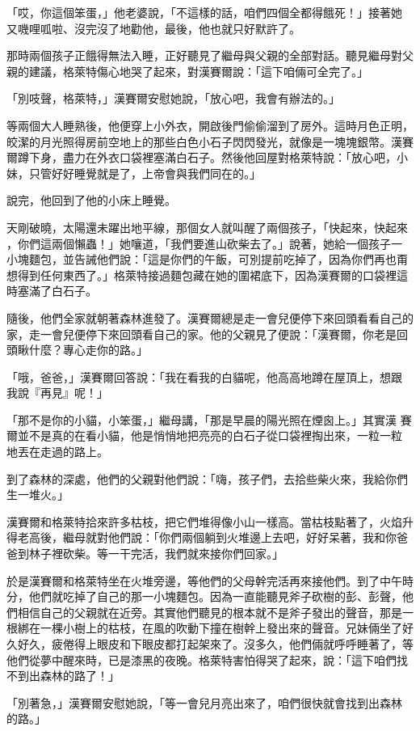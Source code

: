 \documentclass[oneside,10pt]{memoir} %
\begin{document}
「哎，你這個笨蛋，」他老婆說，「不這樣的話，咱們四個全都得餓死！」接著她
又嘰哩呱啦、沒完沒了地勸他，最後，他也就只好默許了。

那時兩個孩子正餓得無法入睡，正好聽見了繼母與父親的全部對話。聽見繼母對父
親的建議，格萊特傷心地哭了起來，對漢賽爾說：「這下咱倆可全完了。」

「別吱聲，格萊特，」漢賽爾安慰她說，「放心吧，我會有辦法的。」

等兩個大人睡熟後，他便穿上小外衣，開啟後門偷偷溜到了房外。這時月色正明，
皎潔的月光照得房前空地上的那些白色小石子閃閃發光，就像是一塊塊銀幣。漢賽
爾蹲下身，盡力在外衣口袋裡塞滿白石子。然後他回屋對格萊特說：「放心吧，小
妹，只管好好睡覺就是了，上帝會與我們同在的。」

說完，他回到了他的小床上睡覺。

天剛破曉，太陽還未躍出地平線，那個女人就叫醒了兩個孩子，「快起來，快起來
，你們這兩個懶蟲！」她嚷道，「我們要進山砍柴去了。」說著，她給一個孩子一
小塊麵包，並告誡他們說：「這是你們的午飯，可別提前吃掉了，因為你們再也甭
想得到任何東西了。」格萊特接過麵包藏在她的圍裙底下，因為漢賽爾的口袋裡這
時塞滿了白石子。

隨後，他們全家就朝著森林進發了。漢賽爾總是走一會兒便停下來回頭看看自己的
家，走一會兒便停下來回頭看自己的家。他的父親見了便說：「漢賽爾，你老是回
頭瞅什麼？專心走你的路。」

「哦，爸爸，」漢賽爾回答說：「我在看我的白貓呢，他高高地蹲在屋頂上，想跟
我說『再見』呢！」

「那不是你的小貓，小笨蛋，」繼母講，「那是早晨的陽光照在煙囪上。」其實漢
賽爾並不是真的在看小貓，他是悄悄地把亮亮的白石子從口袋裡掏出來，一粒一粒
地丟在走過的路上。

到了森林的深處，他們的父親對他們說：「嗨，孩子們，去拾些柴火來，我給你們
生一堆火。」

漢賽爾和格萊特拾來許多枯枝，把它們堆得像小山一樣高。當枯枝點著了，火焰升
得老高後，繼母就對他們說：「你們兩個躺到火堆邊上去吧，好好呆著，我和你爸
爸到林子裡砍柴。等一干完活，我們就來接你們回家。」

於是漢賽爾和格萊特坐在火堆旁邊，等他們的父母幹完活再來接他們。到了中午時
分，他們就吃掉了自己的那一小塊麵包。因為一直能聽見斧子砍樹的彭、彭聲，他
們相信自己的父親就在近旁。其實他們聽見的根本就不是斧子發出的聲音，那是一
根綁在一棵小樹上的枯枝，在風的吹動下撞在樹幹上發出來的聲音。兄妹倆坐了好
久好久，疲倦得上眼皮和下眼皮都打起架來了。沒多久，他們倆就呼呼睡著了，等
他們從夢中醒來時，已是漆黑的夜晚。格萊特害怕得哭了起來，說：「這下咱們找
不到出森林的路了！」

「別著急，」漢賽爾安慰她說，「等一會兒月亮出來了，咱們很快就會找到出森林
的路。」
\end{document}
